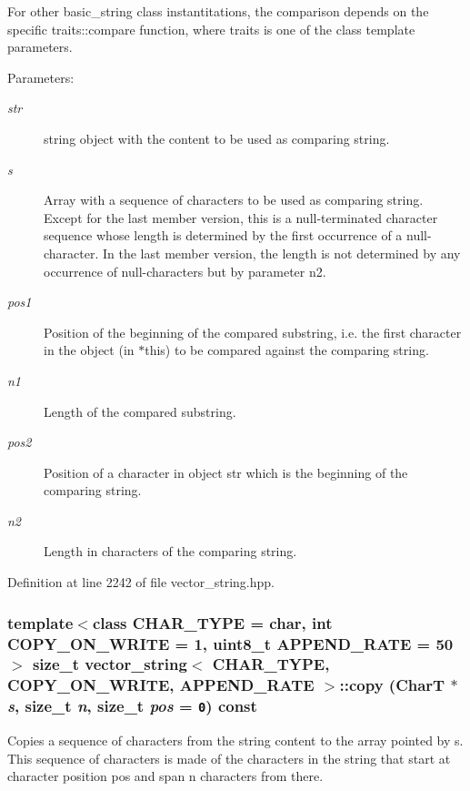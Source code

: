For other basic\_\-string class instantitations, the comparison depends on the specific traits::compare function, where traits is one of the class template parameters.

\begin{Desc}
\item[Parameters:]
\begin{description}
\item[{\em str}]string object with the content to be used as comparing string. \item[{\em s}]Array with a sequence of characters to be used as comparing string. Except for the last member version, this is a null-terminated character sequence whose length is determined by the first occurrence of a null-character. In the last member version, the length is not determined by any occurrence of null-characters but by parameter n2. \item[{\em pos1}]Position of the beginning of the compared substring, i.e. the first character in the object (in $\ast$this) to be compared against the comparing string. \item[{\em n1}]Length of the compared substring. \item[{\em pos2}]Position of a character in object str which is the beginning of the comparing string. \item[{\em n2}]Length in characters of the comparing string. \end{description}
\end{Desc}


Definition at line 2242 of file vector\_\-string.hpp.\hypertarget{classvector__string_7583290c3d10030ebf722fcf5c5ca352}{
\subsubsection[{copy}]{\setlength{\rightskip}{0pt plus 5cm}template$<$class CHAR\_\-TYPE  = char, int COPY\_\-ON\_\-WRITE = 1, uint8\_\-t APPEND\_\-RATE = 50$>$ size\_\-t {\bf vector\_\-string}$<$ CHAR\_\-TYPE, COPY\_\-ON\_\-WRITE, APPEND\_\-RATE $>$::copy (CharT $\ast$ {\em s}, \/  size\_\-t {\em n}, \/  size\_\-t {\em pos} = {\tt 0}) const}}
\label{classvector__string_7583290c3d10030ebf722fcf5c5ca352}


Copies a sequence of characters from the string content to the array pointed by s. This sequence of characters is made of the characters in the string that start at character position pos and span n characters from there.

